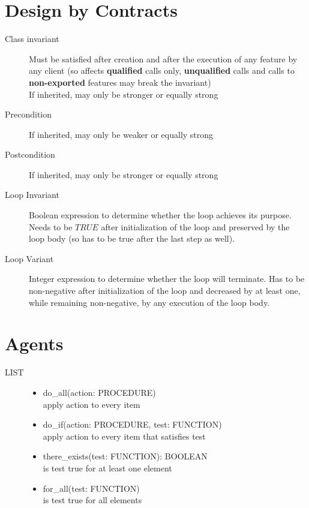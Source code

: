 \documentclass[11pt]{article}
\begin{document}
\section{Design by Contracts}

\begin{description}
	\item[Class invariant] Must be satisfied after creation and after the execution of any feature by any client (so affects \textbf{qualified} calls only, \textbf{unqualified} calls and calls to \textbf{non-exported} features may break the invariant) \\
		If inherited, may only be stronger or equally strong
	\item[Precondition] If inherited, may only be weaker or equally strong
	\item[Postcondition] If inherited, may only be stronger or equally strong
	\item[Loop Invariant] Boolean expression to determine whether the loop achieves its purpose. Needs to be $TRUE$ after initialization of the loop and preserved by the loop body (so has to be true after the last step as well).
	\item[Loop Variant] Integer expression to determine whether the loop will terminate. Has to be non-negative after initialization of the loop and decreased by at least one, while remaining non-negative, by any execution of the loop body.
\end{description}

\section{Agents}

\begin{description}
	\item[LIST]
	\begin{itemize}
		\item do\_all(action: PROCEDURE) \\ apply action to every item
		\item do\_if(action: PROCEDURE, test: FUNCTION) \\ apply action to every item that satisfies test
		\item there\_exists(test: FUNCTION): BOOLEAN \\ is test true for at least one element
		\item for\_all(test: FUNCTION) \\ is test true for all elements
	\end{itemize}
\end{description}
\end{document}
